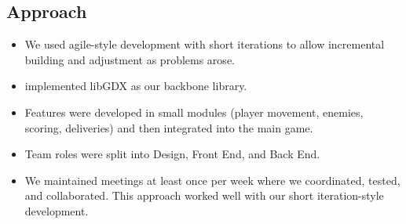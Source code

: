 \documentclass[12pt]{article}
\begin{document}
\subsection{Approach}
	\begin{itemize} [itemsep=0pt]
	\item We used agile-style development with short iterations to allow incremental building and adjustment as problems arose.
	\item implemented libGDX as our backbone library.
	\item Features were developed in small modules (player movement, enemies, scoring, deliveries) and then integrated into the main game.
	\item Team roles were split into Design, Front End, and Back End.
	\item We maintained meetings at least once per week where we coordinated, tested, and collaborated. This approach worked well with our short iteration-style development.
	\end{itemize}
\end{document}
